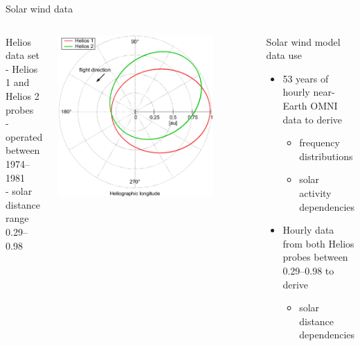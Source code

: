 \begin{frame}[plain,c]{Solar wind data}{}
	\begin{columns}[c]
		
		Helios data set \citep{Rosenbauer1977}\\
		- Helios 1 and Helios 2 probes\\
		- operated between 1974--1981\\
		- solar distance range \SIrange{0.29}{0.98}{\au}\\\ 
		
		\includegraphics[width=0.8\textwidth]{../talk_figures/Helios12_orbits_ecliptic.png}
		

		
		\begin{block}{Solar wind model data use}
			\begin{itemize}
				\item 53 years of hourly near-Earth OMNI data to derive
				\begin{itemize}
					\item frequency distributions
					\item solar activity dependencies
				\end{itemize}
				\item Hourly data from both Helios probes between \SIrange{0.29}{0.98}{\au} to derive
				\begin{itemize}
					\item solar distance dependencies
				\end{itemize}
			\end{itemize}
		\end{block}
		
	\end{columns}
\end{frame}

